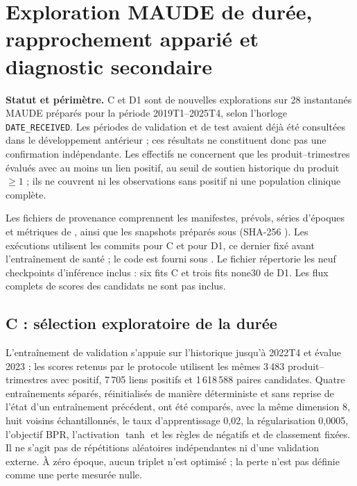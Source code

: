\par{}
\section{Exploration MAUDE de durée, rapprochement apparié et diagnostic secondaire}
\label{supp:post-rc1}

\textbf{Statut et périmètre.} C et D1 sont de nouvelles explorations sur 28 instantanés MAUDE préparés pour la période 2019T1--2025T4, selon l'horloge \texttt{DATE\_RECEIVED}. Les périodes de validation et de test avaient déjà été consultées dans le développement antérieur ; ces résultats ne constituent donc pas une confirmation indépendante. Les effectifs ne concernent que les produit--trimestres évalués avec au moins un lien positif, au seuil de soutien historique du produit $\geq1$ ; ils ne couvrent ni les observations sans positif ni une population clinique complète.

Les fichiers de provenance comprennent les manifestes, prévols, séries d'époques et métriques de , ainsi que les snapshots préparés sous  (SHA-256 ). Les exécutions utilisent les commits  pour C et  pour D1, ce dernier fixé avant l'entraînement de santé ; le code est fourni sous . Le fichier  répertorie les neuf checkpoints d'inférence inclus : six fits C et trois fits none30 de D1. Les flux complets de scores des candidats ne sont pas inclus.

\subsection{C : sélection exploratoire de la durée}

L'entraînement de validation s'appuie sur l'historique jusqu'à 2022T4 et évalue 2023 ; les scores retenus par le protocole utilisent les mêmes 3\,483 produit--trimestres avec positif, 7\,705 liens positifs et 1\,618\,588 paires candidates. Quatre entraînements séparés, réinitialisés de manière déterministe et sans reprise de l'état d'un entraînement précédent, ont été comparés, avec la même dimension 8, huit voisins échantillonnés, le taux d'apprentissage 0,02, la régularisation 0,0005, l'objectif BPR, l'activation $\tanh$ et les règles de négatifs et de classement fixées. Il ne s'agit pas de répétitions aléatoires indépendantes ni d'une validation externe. À zéro époque, aucun triplet n'est optimisé ; la perte n'est pas définie comme une perte mesurée nulle.

